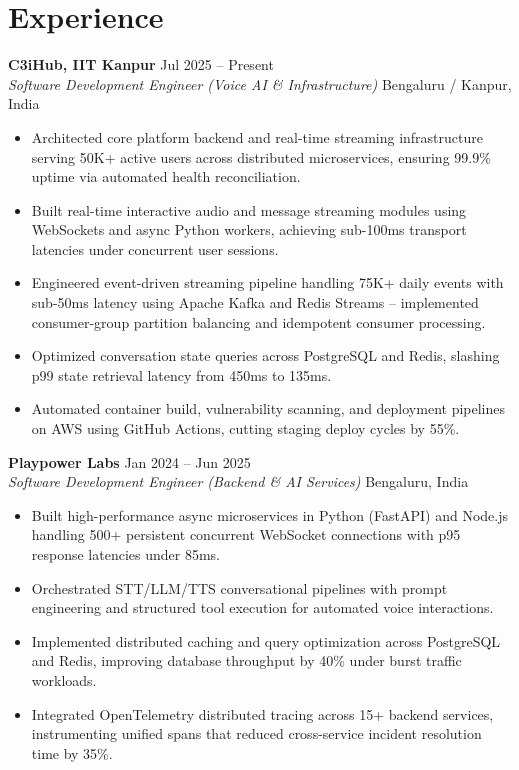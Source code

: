 \documentclass[10pt]{article}
\newcommand{\rItemList}{\begin{itemize}[leftmargin=1.1em, itemsep=1.0pt, topsep=1.0pt, parsep=0pt, label=\textbullet]}
\newcommand{\rEndItemList}{\end{itemize}}
\begin{document}
\section{Experience}

\textbf{C3iHub, IIT Kanpur} \hfill Jul 2025 -- Present \\
\textit{Software Development Engineer (Voice AI \& Infrastructure)} \hfill Bengaluru / Kanpur, India
\rItemList
\item Architected core platform backend and real-time streaming infrastructure serving 50K+ active users across distributed microservices, ensuring 99.9\% uptime via automated health reconciliation.
\item Built real-time interactive audio and message streaming modules using WebSockets and async Python workers, achieving sub-100ms transport latencies under concurrent user sessions.
\item Engineered event-driven streaming pipeline handling 75K+ daily events with sub-50ms latency using Apache Kafka and Redis Streams -- implemented consumer-group partition balancing and idempotent consumer processing.
\item Optimized conversation state queries across PostgreSQL and Redis, slashing p99 state retrieval latency from 450ms to 135ms.
\item Automated container build, vulnerability scanning, and deployment pipelines on AWS using GitHub Actions, cutting staging deploy cycles by 55\%.
\rEndItemList

\textbf{Playpower Labs} \hfill Jan 2024 -- Jun 2025 \\
\textit{Software Development Engineer (Backend \& AI Services)} \hfill Bengaluru, India
\rItemList
\item Built high-performance async microservices in Python (FastAPI) and Node.js handling 500+ persistent concurrent WebSocket connections with p95 response latencies under 85ms.
\item Orchestrated STT/LLM/TTS conversational pipelines with prompt engineering and structured tool execution for automated voice interactions.
\item Implemented distributed caching and query optimization across PostgreSQL and Redis, improving database throughput by 40\% under burst traffic workloads.
\item Integrated OpenTelemetry distributed tracing across 15+ backend services, instrumenting unified spans that reduced cross-service incident resolution time by 35\%.
\rEndItemList
\end{document}
